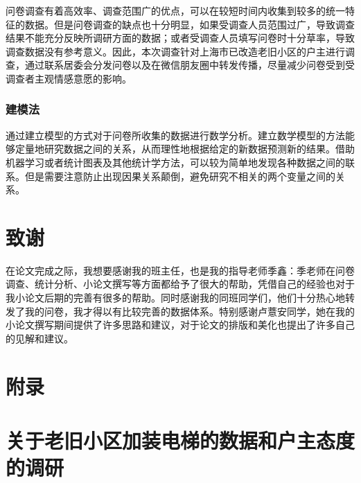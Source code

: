 \documentclass[lang=cn,a4paper]{elegantpaper}
\begin{document}
    问卷调查有着高效率、调查范围广的优点，可以在较短时间内收集到较多的统一特征的数据。但是问卷调查的缺点也十分明显，如果受调查人员范围过广，导致调查结果不能充分反映所调研方面的数据；或者受调查人员填写问卷时十分草率，导致调查数据没有参考意义。因此，本次调查针对上海市已改造老旧小区的户主进行调查，通过联系居委会分发问卷以及在微信朋友圈中转发传播，尽量减少问卷受到受调查者主观情感意愿的影响。

    \subsubsection{建模法}
    通过建立模型的方式对于问卷所收集的数据进行数学分析。建立数学模型的方法能够定量地研究数据之间的关系，从而理性地根据给定的新数据预测新的结果。借助机器学习或者统计图表及其他统计学方法，可以较为简单地发现各种数据之间的联系。但是需要注意防止出现因果关系颠倒，避免研究不相关的两个变量之间的关系。

    \section*{致谢}
    在论文完成之际，我想要感谢我的班主任，也是我的指导老师季鑫：季老师在问卷调查、统计分析、小论文撰写等方面都给予了很大的帮助，凭借自己的经验也对于我小论文后期的完善有很多的帮助。同时感谢我的同班同学们，他们十分热心地转发了我的问卷，我才得以有比较完善的数据体系。特别感谢卢薏安同学，她在我的小论文撰写期间提供了许多思路和建议，对于论文的排版和美化也提出了许多自己的见解和建议。
    
    \clearpage

    
    
    \clearpage
    
    \section*{附录}
    \appendix

    \section{关于老旧小区加装电梯的数据和户主态度的调研}
\end{document}
